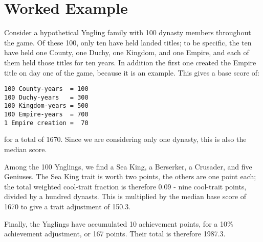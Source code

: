 \documentclass[12pt]{article}
\begin{document}
\section{Worked Example}

Consider a hypothetical Yngling family with 100 dynasty members
throughout the game. Of these 100, only ten have held landed titles;
to be specific, the ten have held one County, one Duchy, one Kingdom,
and one Empire, and each of them held those titles for ten years. In
addition the first one created the Empire title on day one of the
game, because it is an example. This gives a base score of:
\begin{verbatim}
100 County-years  = 100
100 Duchy-years   = 300
100 Kingdom-years = 500
100 Empire-years  = 700
1 Empire creation =  70
\end{verbatim}
for a total of 1670. Since we are considering only one dynasty, this
is also the median score.

Among the 100 Ynglings, we find a Sea King, a Berserker, a Crusader,
and five Geniuses. The Sea King trait is worth two points, the others
are one point each; the total weighted cool-trait fraction is therefore
0.09 - nine cool-trait points, divided by a hundred dynasts. This is
multiplied by the median base score of 1670 to give a trait adjustment
of 150.3.

Finally, the Ynglings have accumulated 10 achievement points, for a
10\% achievement adjustment, or 167 points. Their total is therefore
1987.3.

\newpage
{}


\end{document}
